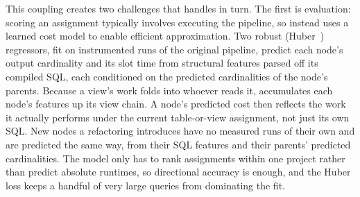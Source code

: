 This coupling creates two challenges that \tool{} handles in turn. 
The first is evaluation: scoring an assignment typically involves executing the pipeline, so \tool{} instead uses a learned cost model to enable efficient approximation. Two robust (Huber~\cite{huber1964robust}) regressors, fit on instrumented runs of the original pipeline, predict each node's output cardinality and its slot time from structural features parsed off its compiled SQL, each conditioned on the predicted cardinalities of the node's parents.
Because a view's work folds into whoever reads it, \tool{} accumulates each node's features up its view chain. A node's predicted cost then reflects the work it actually performs under the current table-or-view assignment, not just its own SQL. New nodes a refactoring introduces have no measured runs of their own and are predicted the same way, from their SQL features and their parents' predicted cardinalities.
The model only has to rank assignments within one project rather than predict absolute runtimes, so directional accuracy is enough, and the Huber loss keeps a handful of very large queries from dominating the fit.
 
